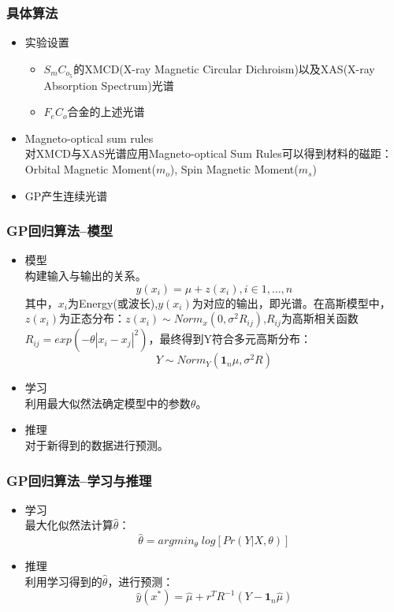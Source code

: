 \documentclass{beamer}
\begin{document}
\begin{frame}
\frametitle{具体算法}
\begin{itemize}
\item 实验设置
\begin{itemize}
\item $S_mC_{o_5}$的XMCD(X-ray Magnetic Circular Dichroism)以及XAS(X-ray Absorption Spectrum)光谱
\item $F_eC_o$合金的上述光谱
\end{itemize}

\item Magneto-optical sum rules \\
对XMCD与XAS光谱应用Magneto-optical Sum Rules可以得到材料的磁距：Orbital Magnetic Moment($m_o$), Spin Magnetic Moment($m_s$)
\item GP产生连续光谱

\end{itemize}
\end{frame}

\begin{frame}
\frametitle{GP回归算法--模型}
\begin{itemize}
\item 模型  \\
构建输入与输出的关系。
\begin{displaymath}
y(x_i) = \mu + z(x_i), i \in {1, \ldots, n}
\end{displaymath}
其中，$x_i$为Energy(或波长),$y(x_i)$为对应的输出，即光谱。在高斯模型中，$z(x_i)$为正态分布：$z(x_i) \sim Norm_{x}(0, \sigma^2R_{ij})$,$R_{ij}$为高斯相关函数$R_{ij}=exp(-\theta|x_i - x_j|^2)$，最终得到Y符合多元高斯分布：
\begin{displaymath}
Y \sim Norm_Y( \boldsymbol{1}_n\mu, \sigma^2R)
\end{displaymath}

\item 学习\\
利用最大似然法确定模型中的参数$\theta$。

\item 推理\\
对于新得到的数据进行预测。

\end{itemize}
\end{frame}

\begin{frame}
\frametitle{GP回归算法--学习与推理}
\begin{itemize}
\item 学习\\
最大化似然法计算$\hat{\theta}$：
\begin{displaymath}
\hat{\theta} = argmin_{\theta} \; log[Pr(Y | X, \theta)]
\end{displaymath}

\item 推理\\
利用学习得到的$\hat{\theta}$，进行预测：
\begin{displaymath}
\hat{y}(x^*) = \hat{\mu} + r^TR^{-1}(Y-\boldsymbol{1}_n\hat{\mu})
\end{displaymath}

\end{itemize}
\end{frame}
\end{document}
